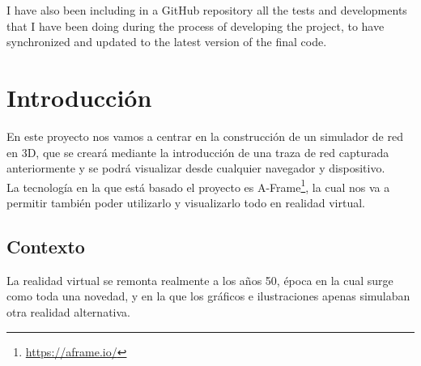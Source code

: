 \documentclass[a4paper, 12pt]{book}
\begin{document}
I have also been including in a GitHub repository all the tests and developments that I have been doing during the process of developing the project, to have synchronized and updated to the latest version of the final code.




\tableofcontents 
\cleardoublepage



\cleardoublepage
\chapter{Introducción}
\label{sec:intro} %

En este proyecto nos vamos a centrar en la construcción de un simulador de red en 3D, que se creará mediante la introducción de una traza de red capturada anteriormente y se podrá visualizar desde cualquier navegador y dispositivo.\\
La tecnología en la que está basado el proyecto es A-Frame\footnote{\url{https://aframe.io/}}, la cual nos va a permitir también poder utilizarlo y visualizarlo todo en realidad virtual.

\section{Contexto}
\label{sec:seccion}
La realidad virtual se remonta realmente a los años 50, época en la cual surge como toda una novedad, y en la que los gráficos e ilustraciones apenas simulaban otra realidad alternativa.
\end{document}
